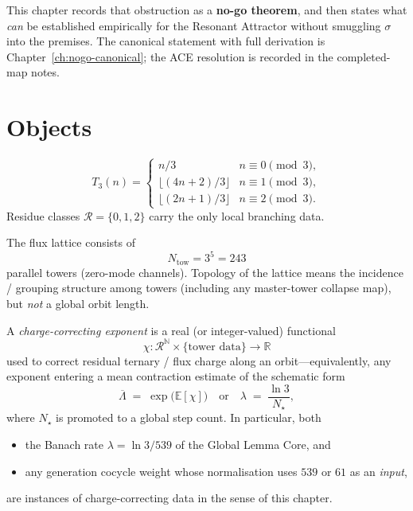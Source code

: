 This chapter records that obstruction as a \textbf{no-go theorem}, and then
states what \emph{can} be established empirically for the Resonant Attractor
without smuggling \(\sigma\) into the premises. The canonical statement with
full derivation is Chapter~\ref{ch:nogo-canonical}; the ACE resolution is
recorded in the completed-map notes.

\section{Objects}
\label{sec:nogo-objects}

\begin{definition}
\label{def:T3-nogo}
\[
T_3(n)=
\begin{cases}
n/3 & n\equiv 0\pmod{3},\\
\lfloor(4n+2)/3\rfloor & n\equiv 1\pmod{3},\\
\lfloor(2n+1)/3\rfloor & n\equiv 2\pmod{3}.
\end{cases}
\]
Residue classes \(\mathcal{R}=\{0,1,2\}\) carry the only local branching data.
\end{definition}

\begin{definition}
\label{def:towers}
The flux lattice consists of
\[
N_{\mathrm{tow}}=3^5=243
\]
parallel towers (zero-mode channels). Topology of the lattice means the
incidence / grouping structure among towers (including any master-tower
collapse map), but \emph{not} a global orbit length.
\end{definition}

\begin{definition}
\label{def:chi}
A \emph{charge-correcting exponent} is a real (or integer-valued) functional
\[
\chi\colon \mathcal{R}^{\mathbb{N}}\times\{\text{tower data}\}
\to\mathbb{R}
\]
used to correct residual ternary / flux charge along an orbit---equivalently,
any exponent entering a mean contraction estimate of the schematic form
\begin{equation}
\label{eq:mean-contr}
\overline{\Lambda}
\;=\;
\exp\bigl(\mathbb{E}[\chi]\bigr)
\quad\text{or}\quad
\lambda
\;=\;
\frac{\ln 3}{N_\star},
\end{equation}
where \(N_\star\) is promoted to a global step count. In particular, both
\begin{itemize}
  \item the Banach rate \(\lambda=\ln 3/539\) of the Global Lemma Core, and
  \item any generation cocycle weight whose normalisation uses \(539\) or
        \(61\) as an \emph{input},
\end{itemize}
are instances of charge-correcting data in the sense of this chapter.
\end{definition}

